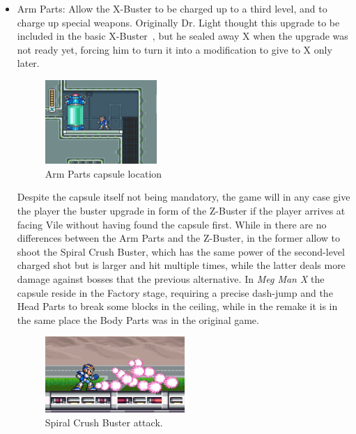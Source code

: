 \begin{itemize}
	\item Arm Parts: Allow the X-Buster to be charged up to a third level, and to charge up special weapons. Originally Dr. Light thought this upgrade to be included in the basic X-Buster~\cite{X:Manual}, but he sealed away X when the upgrade was not ready yet, forcing him to turn it into a modification to give to X only later.
	\begin{figure}[htp]
	\centering
	\includegraphics[width=0.4\textwidth]{figures/X1/Flame_mammoth/Flame_armor_2.jpg}
	\caption{Arm Parts capsule location}
	\end{figure}

	Despite the capsule itself not being mandatory, the game will in any case give the player the buster upgrade in form of the Z-Buster if the player arrives at facing Vile without having found the capsule first. While in \x there are no differences between the Arm Parts and the Z-Buster, in \mhx the former allow to shoot the Spiral Crush Buster, which has the same power of the second-level charged shot but is larger and hit multiple times, while the latter deals more damage against bosses that the previous alternative. In \textit{Meg Man X} the capsule reside in the Factory stage, requiring a precise dash-jump and the Head Parts to break some blocks in the ceiling, while in the remake it is in the same place the Body Parts was in the original game.
	\begin{figure}[htp]
		\centering
		\includegraphics[width=0.5\textwidth]{figures/X1/weapons/Buster_4.jpg}
		\caption{Spiral Crush Buster attack.}
	\end{figure}
	

\end{itemize}
